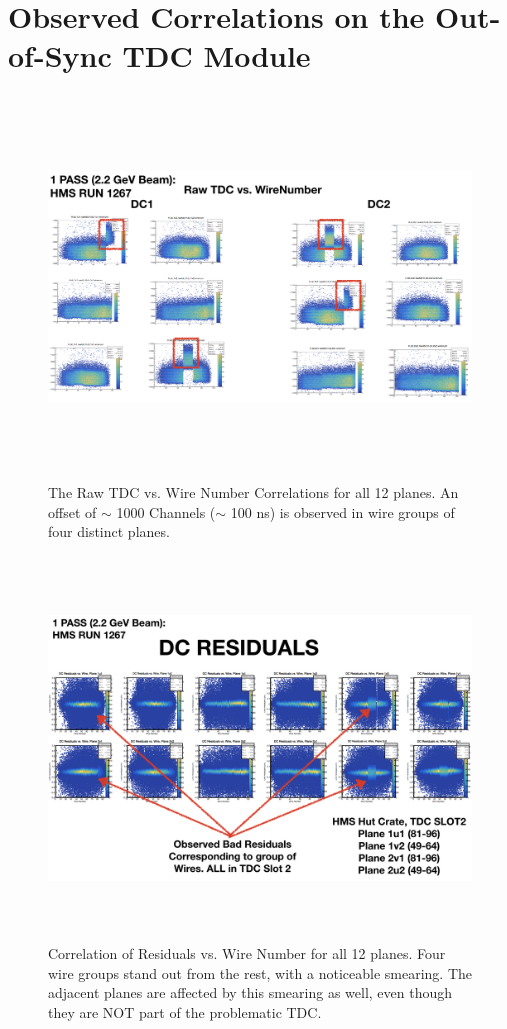 \documentclass[11pt]{article}
\begin{document}
\section{Observed Correlations on the Out-of-Sync TDC Module}  
\begin{figure}[h!]
  \centering
  \includegraphics[width=7.0in, height=4.0in]{shifted_drifttimes.png}
  \caption{The Raw TDC vs. Wire Number Correlations for all 12 planes. An offset of $\sim$ 1000 Channels ($\sim$ 100 ns) is observed
    in wire groups of four distinct planes.}
  \label{fig:shift_dtimes}
\end{figure}
\begin{figure}[h!]
  \centering
  \includegraphics[width=7.0in, height=4.0in]{bad_wireresidual.png}
  \caption{Correlation of Residuals vs. Wire Number for all 12 planes. Four wire groups stand out from the rest, with a noticeable smearing.
  The adjacent planes are affected by this smearing as well, even though they are NOT part of the problematic TDC.}
  \label{fig:wire_residual}
\end{figure}
\end{document}
